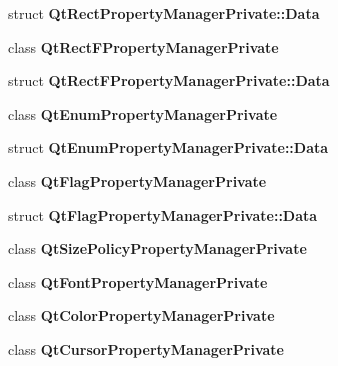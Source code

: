 \begin{DoxyCompactItemize}
\item 
struct {\bf Qt\+Rect\+Property\+Manager\+Private\+::\+Data}
\item 
class {\bf Qt\+Rect\+F\+Property\+Manager\+Private}
\item 
struct {\bf Qt\+Rect\+F\+Property\+Manager\+Private\+::\+Data}
\item 
class {\bf Qt\+Enum\+Property\+Manager\+Private}
\item 
struct {\bf Qt\+Enum\+Property\+Manager\+Private\+::\+Data}
\item 
class {\bf Qt\+Flag\+Property\+Manager\+Private}
\item 
struct {\bf Qt\+Flag\+Property\+Manager\+Private\+::\+Data}
\item 
class {\bf Qt\+Size\+Policy\+Property\+Manager\+Private}
\item 
class {\bf Qt\+Font\+Property\+Manager\+Private}
\item 
class {\bf Qt\+Color\+Property\+Manager\+Private}
\item 
class {\bf Qt\+Cursor\+Property\+Manager\+Private}
\end{DoxyCompactItemize}
